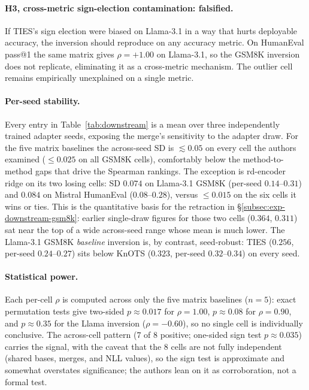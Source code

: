 \paragraph{H3, cross-metric sign-election contamination:
falsified.} If TIES's sign election were biased on Llama-3.1 in a way
that hurts deployable accuracy, the inversion should reproduce on any
accuracy metric. On HumanEval pass@1 the same matrix gives
$\rho = +1.00$ on Llama-3.1, so the GSM8K inversion does not
replicate, eliminating it as a cross-metric mechanism. The outlier
cell remains empirically unexplained on a single metric.

\paragraph{Per-seed stability.} Every entry in
Table~\ref{tab:downstream} is a mean over three independently trained
adapter seeds, exposing the merge's sensitivity to the adapter draw.
For the five matrix baselines the across-seed SD is $\lesssim 0.05$ on
every cell the authors examined ($\leq 0.025$ on all GSM8K cells), comfortably
below the method-to-method gaps that drive the Spearman rankings. The
exception is rd-encoder ridge on its two losing cells: SD $0.074$ on
Llama-3.1 GSM8K (per-seed $0.14$--$0.31$) and $0.084$ on Mistral
HumanEval ($0.08$--$0.28$), versus $\leq 0.015$ on the six cells it
wins or ties. This is the quantitative basis for the retraction in
\S\ref{subsec:exp-downstream-gsm8k}: earlier single-draw figures for
those two cells ($0.364$, $0.311$) sat near the top of a wide
across-seed range whose mean is much lower. The Llama-3.1 GSM8K
\emph{baseline} inversion is, by contrast, seed-robust: TIES
($0.256$, per-seed $0.24$--$0.27$) sits below KnOTS ($0.323$,
per-seed $0.32$--$0.34$) on every seed.

\paragraph{Statistical power.} Each per-cell $\rho$ is computed across
only the five matrix baselines ($n = 5$): exact permutation tests give
two-sided $p \approx 0.017$ for $\rho = 1.00$, $p \approx 0.08$ for
$\rho = 0.90$, and $p \approx 0.35$ for the Llama inversion
($\rho = -0.60$), so no single cell is individually conclusive. The
across-cell pattern ($7$ of $8$ positive; one-sided sign test
$p \approx 0.035$) carries the signal, with the caveat that the $8$
cells are not fully independent (shared bases, merges, and NLL
values), so the sign test is approximate and somewhat overstates
significance; the authors lean on it as corroboration, not a formal test.
